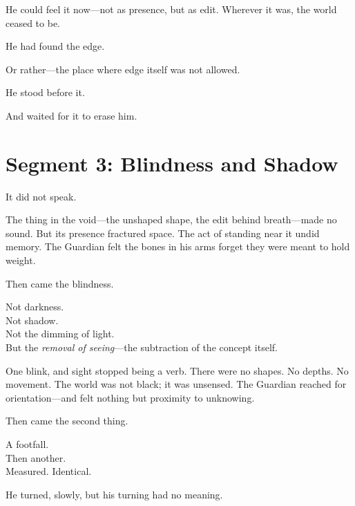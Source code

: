 \documentclass[9pt]{article}
\begin{document}
\vspace{0.5em}
He could feel it now---not as presence, but as edit. Wherever it was, the world ceased to be.

\vspace{0.5em}
He had found the edge.

\vspace{0.5em}
Or rather---the place where edge itself was not allowed.

\vspace{0.5em}
He stood before it.

\vspace{0.5em}
And waited for it to erase him.

\newpage

\section*{Segment 3: Blindness and Shadow}

It did not speak.

\vspace{0.5em}
The thing in the void---the unshaped shape, the edit behind breath---made no sound. But its presence fractured space. The act of standing near it undid memory. The Guardian felt the bones in his arms forget they were meant to hold weight.

\vspace{0.5em}
Then came the blindness.

\vspace{0.5em}
Not darkness.\\
Not shadow.\\
Not the dimming of light.\\
But the \textit{removal of seeing}---the subtraction of the concept itself.

\vspace{0.5em}
One blink, and sight stopped being a verb. There were no shapes. No depths. No movement. The world was not black; it was unsensed. The Guardian reached for orientation---and felt nothing but proximity to unknowing.

\vspace{0.5em}
Then came the second thing.

\vspace{0.5em}
A footfall.\\
Then another.\\
Measured. Identical.

\vspace{0.5em}
He turned, slowly, but his turning had no meaning.
\end{document}
